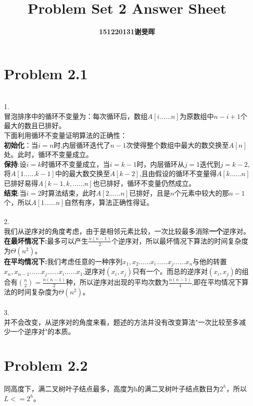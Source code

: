 \documentclass[twocolumn]{ctexart}
\begin{document}
	\title{Problem Set 2 Answer Sheet}
	\author{\textbf{151220131谢旻晖}}
	\date{}
	\maketitle
\section*{Problem 2.1}

~\\
1.\\
\indent 冒泡排序中的循环不变量为：每次循环后，数组$A[i……n]$为原数组中$n-i+1$个最大的数且已排好。\\
\indent
下面利用循环不变量证明算法的正确性：\\
\indent
\textbf{初始化}：当$i=n$时,内层循环迭代了$n-1$次使得整个数组中最大的数交换至$A[n]$处。此时，循环不变量成立。\\
\indent
\textbf{保持}:设$i=k$时循环不变量成立，当$i=k-1$时，内层循环从$j=1$迭代到$j=k-2$,将$A[1……k-1]$中的最大数交换至$A[k-2]$,且由假设的循环不变量得$A[k……n]$已排好易得$A[k-1,k,……n]$也已排好，循环不变量仍然成立。\\
\indent
\textbf{结束}:当$i=2$时算法结束，此时$A[2……n]$已排好，且是$n$个元素中较大的那$n-1$个，所以$A[1……n]$自然有序，算法正确性得证。\\
~\\
2.\\
\indent 我们从逆序对的角度考虑，由于是相邻元素比较，一次比较最多消除\textbf{一个}逆序对。\\
\indent
\textbf{在最坏情况下:}最多可以产生$\frac{n(n-1)}{2}$个逆序对，所以最坏情况下算法的时间复杂度为$\Theta(n^{2})$。\\
\indent
\textbf{在平均情况下:}我们考虑任意的一种序列${x_{1},x_{2}……x_{i}……x_{j}……x_{n}}$与他的转置$x_{n},x_{n-1}……x_{j}……x_{i}……x_{1}$,逆序对$(x_{i},x_{j})$只有一个。而总的逆序对$(x_{i},x_{j})$的组合有$\binom{n}{2}=\frac{n(n-1)}{2}$种，所以逆序对出现的平均次数为$\frac{n(n-1)}{4}$,即在平均情况下算法的时间复杂度为$\Theta(n^{2})$。\\
~\\
3.\\
\indent 并不会改变，从逆序对的角度来看，题述的方法并没有改变算法"一次比较至多减少一个逆序对"的本质。\\

\section*{Problem 2.2}
\indent 同高度下，满二叉树叶子结点最多，高度为h的满二叉树叶子结点数目为$2^{h}$，所以$L<=2^{h}$。\\
\end{document}
